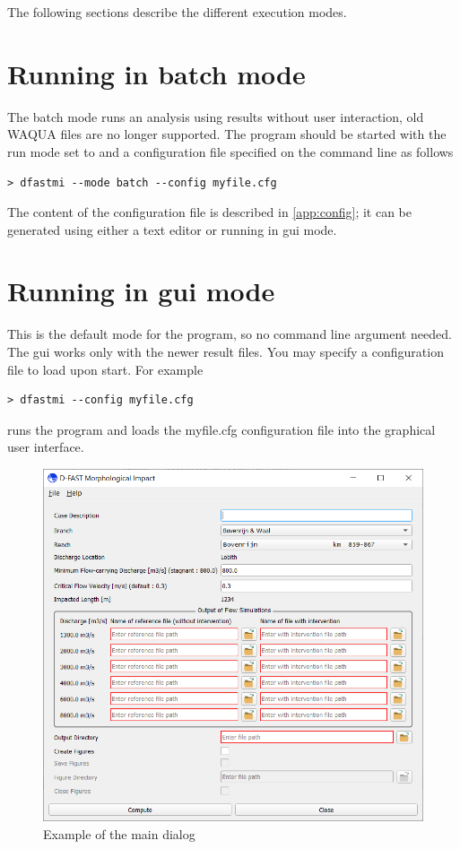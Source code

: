 The following sections describe the different execution modes.

\section{Running in batch mode}

The batch mode runs an analysis using \dflowfm results without user interaction, old WAQUA files are no longer supported.
The program should be started with the run mode set to  and a configuration file specified on the command line as follows

\begin{Verbatim}
> dfastmi --mode batch --config myfile.cfg
\end{Verbatim}

The content of the configuration file is described in \autoref{app:config}; it can be generated using either a text editor or \dfastmi running in gui mode.

\section{Running in gui mode}

This is the default mode for the program, so no command line argument needed.
The gui works only with the newer \dflowfm result files.
You may specify a configuration file to load upon start.
For example

\begin{Verbatim}
> dfastmi --config myfile.cfg
\end{Verbatim}

runs the program and loads the myfile.cfg configuration file into the graphical user interface.

\begin{figure}
\center
\includegraphics[width=12cm]{figures/main_dialog.png}
\caption{Example of the main dialog}
\end{figure}

